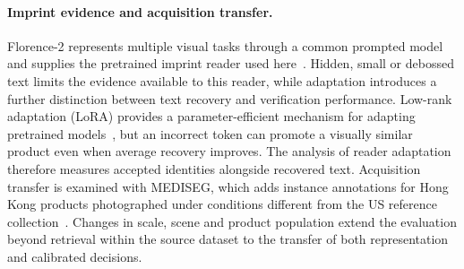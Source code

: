 \paragraph{Imprint evidence and acquisition transfer.}
Florence-2 represents multiple visual tasks through a common prompted model and supplies the pretrained imprint reader used here~\citep{xiao2024florence2}. Hidden, small or debossed text limits the evidence available to this reader, while adaptation introduces a further distinction between text recovery and verification performance. Low-rank adaptation (LoRA) provides a parameter-efficient mechanism for adapting pretrained models~\citep{hu2022lora}, but an incorrect token can promote a visually similar product even when average recovery improves. The analysis of reader adaptation therefore measures accepted identities alongside recovered text. Acquisition transfer is examined with MEDISEG, which adds instance annotations for Hong Kong products photographed under conditions different from the US reference collection~\citep{mediseg2026,chu2026mediseg}. Changes in scale, scene and product population extend the evaluation beyond retrieval within the source dataset to the transfer of both representation and calibrated decisions.
